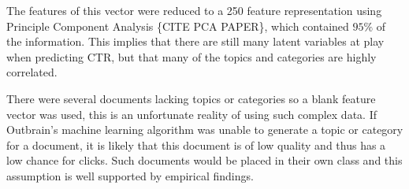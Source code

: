 \documentclass[fleqn,10pt]{SelfArx} %
\begin{document}
The features of this vector were reduced to a 250 feature representation using Principle Component Analysis \{CITE PCA PAPER\}, which contained $95\%$ of the information. This implies that there are 
still many latent variables at play when predicting CTR, but that many of the topics and categories are highly correlated.

%





There were several documents lacking topics or categories so a blank feature vector was used, this is an unfortunate reality of using such complex data. If Outbrain's machine learning algorithm
was unable to generate a topic or category for a document, it is likely that this document is of low quality and thus has a low chance for clicks. Such documents would be placed in their own class and this assumption is well supported by empirical findings.


\end{document}
